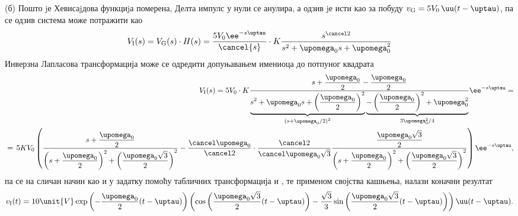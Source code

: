 (б)
Пошто jе Хевисаjдова функциjа померена, Делта импулс у нули се анулира, а одзив jе исти као за побуду
$v_{\rm G} = 5 V_0 \, \uu(t - \uptau)$, па се одзив система може потражити као 
\begin{eqnarray}
    V_{\rm I}(s) = 
    V_{\rm G}(s) \cdot H(s)
    =
    \dfrac{5 V_0 \ee^{-s\uptau}}{\cancel{s}} \cdot 
    K\dfrac{s^{\cancel2}}{s^2 + \upomega_0 s + \upomega_0^2 }
\end{eqnarray}
Инверзна Лапласова трансформација може се одредити допуњавањем имениоца до потпуног квадрата
\begin{eqnarray*}
    && V_{\rm I}(s)=5 V_0 \cdot 
    K\dfrac{
        s + \dfrac{\upomega_0}{2} - \dfrac{\upomega_0}{2}
    }{
    \underbrace{s^2 + \upomega_0 s + \left(\dfrac{\upomega_0}{2}\right)^2}_{
        \left(
            s + \upomega_0/2
        \right)^2
    } 
    \underbrace{
    - \left(\dfrac{\upomega_0}{2}\right)^2  + \upomega_0^2 }_{ {3\upomega_0^2}/{4} } 
    }
    \ee^{-s\uptau} = \\
    &=& \hspace*{-2mm} 5KV_0 
        \left(
            \dfrac{
            s + \dfrac{\upomega_0}{2} 
            }{
               \left(s + \dfrac{\upomega_0}2 \right)^2 + \left( \dfrac{\upomega_0 \sqrt 3}{2} \right)^2
            }
            - \dfrac{\cancel \upomega_0}{\cancel 2}
            \cdot
            \dfrac{\cancel 2}{\cancel \upomega_0 \sqrt3}
            \dfrac{
                \dfrac{\upomega_0 \sqrt 3}{2}
            }{
                \left(s + \dfrac{\upomega_0}2 \right)^2 + \left( \dfrac{\upomega_0 \sqrt 3}{2} \right)^2
            }
    \right)
    \ee^{-s\uptau},
\end{eqnarray*}
па се на сличан начин као и у задатку  помоћу табличних трансформација 
 и , те применом својства кашњења, налази коначни резултат 
\begin{equation}
    v_{\rm I}(t) = 
    10\unit{V}
    \exp\left(- \dfrac{\upomega_0}{2} (t-\uptau)\right)
    \left( 
        \cos\left( \dfrac{\upomega_0\sqrt3}{2}(t-\uptau) \right)
        -
        \dfrac{\sqrt 3}{3}
        \sin\left( \dfrac{\upomega_0\sqrt3}{2}(t-\uptau) \right)
    \right) \uu(t-\uptau).
\end{equation}